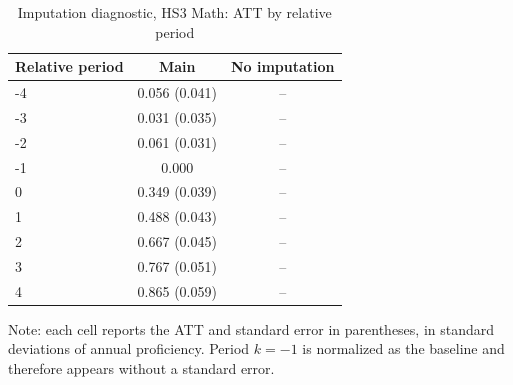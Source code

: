 ﻿\begin{table}[!htbp]
\centering
\caption{Imputation diagnostic, HS3 Math: ATT by relative period}
\label{tab:ap_event_imputacao_HS3_mat}
\vspace{-0.15cm}
\scriptsize
\setlength{\tabcolsep}{4pt}
\renewcommand{\arraystretch}{0.92}
\begin{tabular}{lcc}
\toprule
Relative period & Main & No imputation \\
\midrule
-4 & 0.056 (0.041) & -- \\
-3 & 0.031 (0.035) & -- \\
-2 & 0.061 (0.031) & -- \\
-1 & 0.000 & -- \\
0 & 0.349 (0.039) & -- \\
1 & 0.488 (0.043) & -- \\
2 & 0.667 (0.045) & -- \\
3 & 0.767 (0.051) & -- \\
4 & 0.865 (0.059) & -- \\
\bottomrule
\end{tabular}
\begin{flushleft}
\footnotesize Note: each cell reports the ATT and standard error in parentheses, in standard deviations of annual proficiency. Period \(k=-1\) is normalized as the baseline and therefore appears without a standard error.
\end{flushleft}
\end{table}



